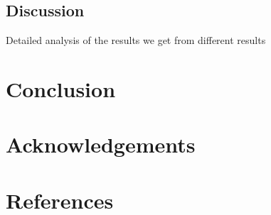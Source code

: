 \documentclass{article} %
\begin{document}
\subsection{Discussion}
Detailed analysis of the results we get from different results

\section{Conclusion}

\section{Acknowledgements}

\section{References}



\end{document}
